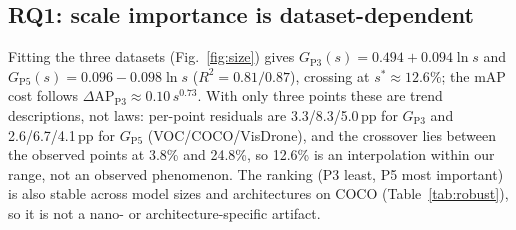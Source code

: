 \documentclass[times,twocolumn,final,authoryear]{elsarticle}
\begin{document}
\subsection{RQ1: scale importance is dataset-dependent}
\begin{table}[h]\centering\footnotesize
\caption{Per-scale importance is monotonically tied to the small-object fraction $s$: gradient contribution $G$ (cols. 3--4) and mAP cost $\Delta$AP of removing a scale (cols. 5--6). The redundant scale flips between VOC (drop P3) and VisDrone (drop P5).}
\label{tab:scales}

\end{table}
Fitting the three datasets (Fig.~\ref{fig:size}) gives $G_{\mathrm{P3}}(s)=0.494+0.094\ln s$ and $G_{\mathrm{P5}}(s)=0.096-0.098\ln s$ ($R^2=0.81/0.87$), crossing at $s^*\approx12.6\%$; the mAP cost follows $\Delta\text{AP}_{\mathrm{P3}}\approx0.10\,s^{0.73}$. With only three points these are trend descriptions, not laws: per-point residuals are 3.3/8.3/5.0\,pp for $G_{\mathrm{P3}}$ and 2.6/6.7/4.1\,pp for $G_{\mathrm{P5}}$ (VOC/COCO/VisDrone), and the crossover lies between the observed points at 3.8\% and 24.8\%, so 12.6\% is an interpolation within our range, not an observed phenomenon. The ranking (P3 least, P5 most important) is also stable across model sizes and architectures on COCO (Table~\ref{tab:robust}), so it is not a nano- or architecture-specific artifact.
\end{document}
